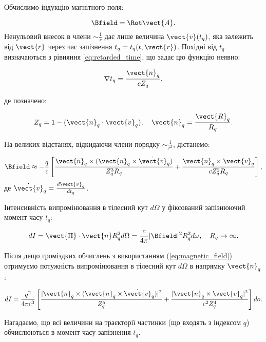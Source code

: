 Обчислимо індукцію магнітного поля:

\begin{equation*}
	\Bfield = \Rot\vect{A}.
\end{equation*}
Ненульовий внесок в члени \( \sim \frac{1}{r} \) дає лише величина \( \vect{v}(t_q) \), яка залежить від \( \vect{r} \) через час запізнення \( t_q =
t_q(t, \vect{r}) \). Похідні від \( t_q \) визначаються з рівняння \eqref{eq:retarded_time}, що задає цю функцію неявно:

\begin{equation}
	\nabla t_q = \frac{\vect{n}_q}{c Z_q},
	\label{eq:nabla_tq}
\end{equation}

де позначено:

\[
	Z_q = 1 - (\vect{n}_q \cdot \vect{v}_q), \quad \vect{n}_q = \frac{\vect{R}_q}{R_q}.
\]

На великих відстанях, відкидаючи члени порядку \( \sim \frac{1}{r^2} \), дістанемо:

\begin{equation}
	\Bfield \approx -\frac{q}{c} \left[ \frac{\vect{n}_q \times (\vect{n}_q \times \dot{\vect{v}}_q)}{Z_q^3 R_q} + \frac{\vect{n}_q \times \vect{v}_q}{c
			Z_q^2 R_q} \right],
	\label{eq:magnetic_field}
\end{equation}
де \( \dot{\vect{v}}_q = \frac{d\vect{v}_q}{dt_q} \).

Інтенсивність випромінювання в тілесний кут \( d\Omega \) у фіксований запізнюючий момент часу \( t_q \):

\begin{equation*}
	dI = \vect{\Pi} \cdot \vect{n} R_q^2 d\Omega = \frac{c}{4\pi} |\Bfield|^2 R_q^2 d\omega, \quad R_q \to \infty.
\end{equation*}

Після дещо громіздких обчислень з використанням (\ref{eq:magnetic_field}) отримуємо потужність випромінювання в тілесний кут \( d\Omega \) в напрямку \(
\vect{n}_q \):

\begin{equation}
	dI = \frac{q^2}{4\pi c^3} \left[ \frac{|\vect{n}_q \times (\vect{n}_q \times \dot{\vect{v}}_q)|^2}{Z_q^5} + \frac{|\vect{n}_q \times \vect{v}_q|^2}{c^2
			Z_q^4} \right] do.
	\label{eq:radiation_power}
\end{equation}

Нагадаємо, що всі величини на траєкторії частинки (що входять з індексом \( q \)) обчислюються в момент часу запізнення \( t_q \).

